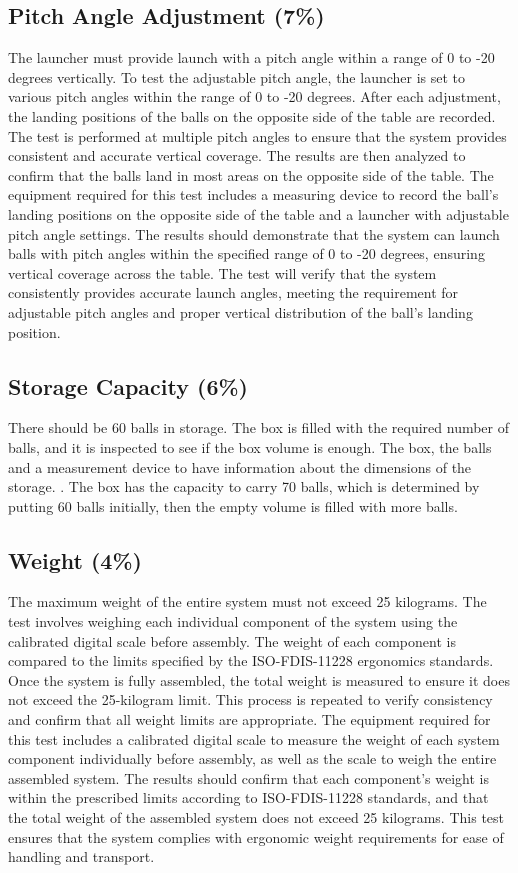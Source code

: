 \documentclass[12pt]{report}
\begin{document}
\subsection{Pitch Angle Adjustment (7\%)}
The launcher must provide launch with a pitch angle within a range of 0 to -20 degrees vertically. To test the adjustable pitch angle, the launcher is set to various pitch angles within the range of 0 to -20 degrees. After each adjustment, the landing positions of the balls on the opposite side of the table are recorded. The test is performed at multiple pitch angles to ensure that the system provides consistent and accurate vertical coverage. The results are then analyzed to confirm that the balls land in most areas on the opposite side of the table. The equipment required for this test includes a measuring device to record the ball's landing positions on the opposite side of the table and a launcher with adjustable pitch angle settings. The results should demonstrate that the system can launch balls with pitch angles within the specified range of 0 to -20 degrees, ensuring vertical coverage across the table. The test will verify that the system consistently provides accurate launch angles, meeting the requirement for adjustable pitch angles and proper vertical distribution of the ball's landing position.

\subsection{Storage Capacity (6\%)}
There should be 60 balls in storage. The box is filled with the required number of balls, and it is inspected to see if the box volume is enough. The box, the balls and a measurement device to have information about the dimensions of the storage. . The box has the capacity to carry 70 balls, which is determined by putting 60 balls initially, then the empty volume is filled with more balls.

\subsection{Weight (4\%)}
The maximum weight of the entire system must not exceed 25 kilograms. The test involves weighing each individual component of the system using the calibrated digital scale before assembly. The weight of each component is compared to the limits specified by the ISO-FDIS-11228 ergonomics standards. Once the system is fully assembled, the total weight is measured to ensure it does not exceed the 25-kilogram limit. This process is repeated to verify consistency and confirm that all weight limits are appropriate. The equipment required for this test includes a calibrated digital scale to measure the weight of each system component individually before assembly, as well as the scale to weigh the entire assembled system. The results should confirm that each component's weight is within the prescribed limits according to ISO-FDIS-11228 standards, and that the total weight of the assembled system does not exceed 25 kilograms. This test ensures that the system complies with ergonomic weight requirements for ease of handling and transport.
\end{document}
